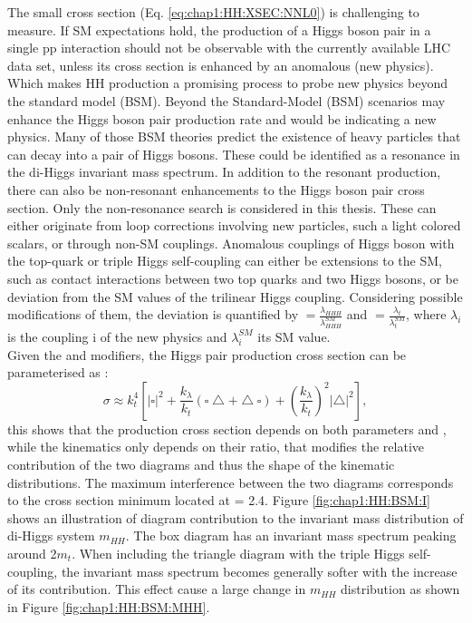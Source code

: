 The small cross section (Eq. \ref{eq:chap1:HH:XSEC:NNL0}) is challenging to measure. If SM expectations hold, the production of a Higgs boson pair in a single pp interaction should not be observable with the currently available LHC data set, unless its cross section is enhanced by an anomalous (new physics). Which makes HH production a promising process to probe new physics beyond the standard model (BSM). Beyond the Standard-Model (BSM) scenarios may enhance the Higgs boson pair production rate and would be indicating a new physics. Many of those BSM theories predict the existence of heavy particles that can decay into a pair of Higgs bosons. These could be identified as a resonance in the di-Higgs invariant mass spectrum. In addition to the resonant production, there can also be non-resonant enhancements to the Higgs boson pair cross section. Only the non-resonance search is considered in this thesis. These can either originate from loop corrections involving new particles, such a light colored scalars, or through non-SM couplings. Anomalous couplings of Higgs boson with the top-quark or triple Higgs self-coupling can either be extensions to the SM, such as contact interactions between two top quarks and two Higgs bosons, or be deviation from the SM values of the trilinear Higgs coupling. Considering possible modifications of them, the deviation is quantified by \kl $ = \frac{\lambda_{HHH}}{\lambda_{HHH}^{SM}}$ and \kt $= \frac{\lambda_{t}}{\lambda_{t}^{SM}}$, where $\lambda_{i}$ is the coupling i of the new physics and $\lambda_{i}^{SM}$ its SM value. \\
Given the \kt and \kl modifiers, the Higgs pair production cross section can be parameterised as :
\begin{equation}
  \sigma \approx k_{t}^{4}\left[|\square|^{2}+\frac{k_{\lambda}}{k_{t}}(\square\bigtriangleup+\bigtriangleup \square)+\left(\frac{k_{\lambda}}{k_{t}}\right)^{2}|\bigtriangleup|^{2}\right], 
\end{equation}
this shows that the production cross section depends on both parameters \kt and \kl, while the kinematics only depends on their ratio, that modifies the relative contribution of the two diagrams and thus the shape of the kinematic distributions. The maximum interference between the two diagrams corresponds to the cross section minimum located at \kl = 2.4\kt. Figure \ref{fig:chap1:HH:BSM:I} shows an illustration of diagram contribution to the invariant mass distribution of di-Higgs system $m_{HH}$. The box diagram has an invariant mass spectrum peaking around 2$m_t$. When including the triangle diagram with the triple Higgs self-coupling, the invariant mass spectrum becomes generally softer with the increase of its contribution. This effect cause a large change in $m_{HH}$ distribution as shown in Figure \ref{fig:chap1:HH:BSM:MHH}.
